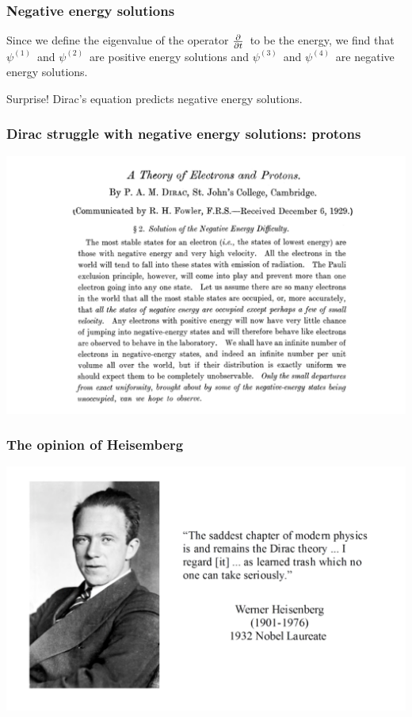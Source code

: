 %
\begin{frame}
\frametitle{Negative energy solutions}

Since we define the eigenvalue of the operator $\pdv{t}$~to be the energy, we find that 
$\psi^{(1)}$~and $\psi^{(2)}$~are positive energy solutions and 
$\psi^{(3)}$~and $\psi^{(4)}$~are negative energy solutions.

\begin{alertblock}{Surprise!}
Dirac's equation \alert{predicts} negative energy solutions.
\end{alertblock}
\end{frame}
%
\begin{frame}
\frametitle{Dirac struggle with negative energy solutions: protons}

\includegraphics[scale=0.3]{img/DiracElectronProton.png}
\end{frame}

\begin{frame}
\frametitle{The opinion of Heisemberg}

\includegraphics[scale=0.3]{img/HeisembergOpinionDirac.png}
\end{frame}

